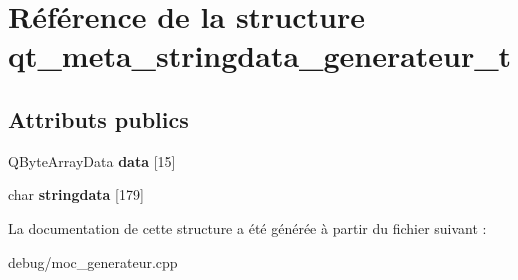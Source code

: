 \hypertarget{structqt__meta__stringdata__generateur__t}{}\section{Référence de la structure qt\+\_\+meta\+\_\+stringdata\+\_\+generateur\+\_\+t}
\label{structqt__meta__stringdata__generateur__t}
\subsection*{Attributs publics}
\begin{DoxyCompactItemize}
\item 
\mbox{\label{structqt__meta__stringdata__generateur__t_a1a05079d49d63726012e5d1dbd633d86}} 
Q\+Byte\+Array\+Data {\bfseries data} \mbox{[}15\mbox{]}
\item 
\mbox{\label{structqt__meta__stringdata__generateur__t_a038715f9f88c8d0d9ea9b94a3e1101a9}} 
char {\bfseries stringdata} \mbox{[}179\mbox{]}
\end{DoxyCompactItemize}


La documentation de cette structure a été générée à partir du fichier suivant \+:\begin{DoxyCompactItemize}
\item 
debug/moc\+\_\+generateur.\+cpp\end{DoxyCompactItemize}
